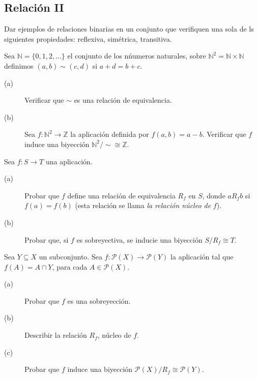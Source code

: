 \subsection{Relación II}

\begin{ejercicio}
    Dar ejemplos de relaciones binarias en un conjunto que verifiquen una sola de ls siguientes propiedades: reflexiva, simétrica, transitiva.
\end{ejercicio}

\begin{ejercicio}
    Sea $\mathbb{N} = \{0,1,2, \ldots\}$ el conjunto de los nńumeros naturales, sobre $\mathbb{N}^2 = \mathbb{N}\times \mathbb{N}$ definimos $(a,b)\sim (c,d)$ si $a+d=b+c$.
    \begin{description}
        \item [(a)] Verificar que $\sim$ es una relación de equivalencia.
        \item [(b)] Sea $f:\mathbb{N}^2\to \mathbb{Z}$ la aplicación definida por $f(a,b)=a-b$. Verificar que $f$ induce una biyección $\mathbb{N}^2 /\sim \cong \mathbb{Z}$.
    \end{description}
\end{ejercicio}

\begin{ejercicio}
    Sea $f:S\to T$ una aplicación.
    \begin{description}
        \item [(a)] Probar que $f$ define una relación de equivalencia $R_f$ en $S$, donde $aR_f b$ si $f(a) = f(b)$ (esta relación se llama \emph{la relación núcleo de} $f$).
        \item [(b)] Probar que, si $f$ es sobreyectiva, se inducie una biyección $S/R_f\cong T$.
    \end{description}
\end{ejercicio}

\begin{ejercicio}
    Sea $Y\subseteq X$ un subconjunto. Sea $f:\mathcal{P}(X)\to \mathcal{P}(Y)$ la aplicación tal que $f(A) = A\cap Y$, para cada $A\in \mathcal{P}(X)$.
    \begin{description}
        \item [(a)] Probar que $f$ es una sobreyección.
        \item [(b)] Describir la relación $R_f$, núcleo de $f$.
        \item [(c)] Probar que $f$ induce una biyección $\mathcal{P}(X)/R_f\cong \mathcal{P}(Y)$.
    \end{description}
\end{ejercicio}

